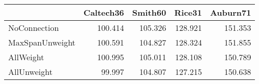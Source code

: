 \begin{tabular}{lrrrr}
\toprule
{} & Caltech36 & Smith60 &  Rice31 & Auburn71 \\
\midrule
NoConnection    &   100.414 & 105.326 & 128.921 &  151.353 \\
MaxSpanUnweight &   100.591 & 104.827 & 128.324 &  151.855 \\
AllWeight       &   100.995 & 105.011 & 128.108 &  150.789 \\
AllUnweight     &    99.997 & 104.807 & 127.215 &  150.638 \\
\bottomrule
\end{tabular}
